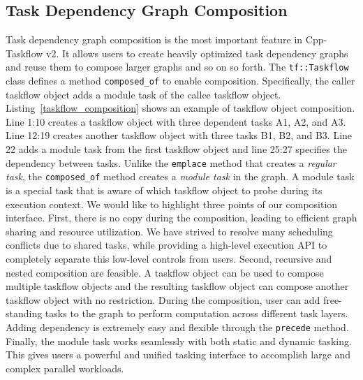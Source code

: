 \documentclass[conference]{IEEEtran}
\begin{document}
\subsection{Task Dependency Graph Composition}

Task dependency graph composition is the most important feature in Cpp-Taskflow v2.
It allows users to create heavily optimized task dependency graphs and 
reuse them to compose larger graphs and so on so forth.
The \lstinline{tf::Taskflow} class defines a method \lstinline{composed_of} to enable composition.
Specifically, the caller taskflow object adds a module task of the callee taskflow object. 
Listing~\ref{taskflow_composition} shows an example of taskflow object composition.
Line 1:10 creates a taskflow object with three dependent tasks A1, A2, and A3. 
Line 12:19 creates another taskflow object with three tasks B1, B2, and B3.
Line 22 adds a module task from the first taskflow object and
line 25:27 specifies the dependency between tasks.
Unlike the \lstinline{emplace} method that creates a \textit{regular task}, 
the \lstinline{composed_of} method creates a \textit{module task} in the graph.
A module task is a special task that is aware of which taskflow object to probe
during its execution context.
%
We would like to highlight three points of our composition interface.
First, there is no copy during the composition, 
leading to efficient graph sharing and resource utilization.
We have strived to resolve many scheduling conflicts due to shared tasks,
while providing a high-level execution API to completely separate this low-level controls 
from users.
Second, recursive and nested composition are feasible.
A taskflow object can be used to compose multiple taskflow objects and the resulting taskflow object
can compose another taskflow object with no restriction.
During the composition, user can add free-standing tasks to the graph
to perform computation across different task layers.
Adding dependency is extremely easy and flexible through the \lstinline{precede} method.
Finally, the module task works seamlessly with both static and dynamic tasking.
This gives users a powerful and unified tasking interface to accomplish 
large and complex parallel workloads.
\end{document}

